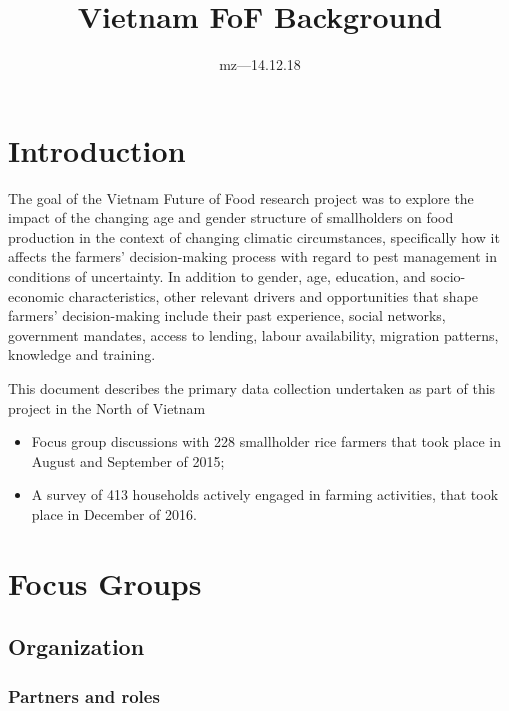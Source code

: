 \documentclass[]{article}
\title{Vietnam FoF Background}
\author{mz---14.12.18}
\date{}
\providecommand{\tightlist}{%
  \setlength{\itemsep}{0pt}\setlength{\parskip}{0pt}}
\begin{document}
\maketitle

{
\setcounter{tocdepth}{3}
\tableofcontents
}
\hypertarget{introduction}{%
\section{Introduction}\label{introduction}}

The goal of the Vietnam Future of Food research project was to explore
the impact of the changing age and gender structure of smallholders on
food production in the context of changing climatic circumstances,
specifically how it affects the farmers' decision-making process with
regard to pest management in conditions of uncertainty. In addition to
gender, age, education, and socio-economic characteristics, other
relevant drivers and opportunities that shape farmers' decision-making
include their past experience, social networks, government mandates,
access to lending, labour availability, migration patterns, knowledge
and training.

This document describes the primary data collection undertaken as part
of this project in the North of Vietnam

\begin{itemize}
\tightlist
\item
  Focus group discussions with 228 smallholder rice farmers that took
  place in August and September of 2015;
\item
  A survey of 413 households actively engaged in farming activities,
  that took place in December of 2016.
\end{itemize}

\hypertarget{focus-groups}{%
\section{Focus Groups}\label{focus-groups}}

\hypertarget{organization}{%
\subsection{Organization}\label{organization}}

\hypertarget{partners-and-roles}{%
\subsubsection{Partners and roles}\label{partners-and-roles}}
\end{document}
